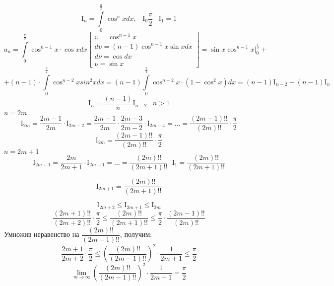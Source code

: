 \documentclass[../../main.tex]{subfiles}
\begin{document}
\[
\mathrm{I}_n = \int\limits_0^{\frac{\pi}{2}} \cos^n x dx, \;\;\;
\mathrm{I}_0 \dfrac{\pi}{2} \;\;\; \mathrm{I}_{1} = 1
\]
\[
a_n =  \int\limits_0^{\frac{\pi}{2}} \cos^{n - 1} x \cdot \cos x dx
\left[\begin{array}{l}
\upsilon = \cos^{n-1}x\\
d\upsilon = (n - 1) \cos^{n-1}x \sin x dx\\
d \nu = \cos dx\\
\nu = \sin x
\end{array}\right]
= \sin x \cos^{n-1} x \big|_0^{\frac{\pi}{2}} + 
\]
\[
+ (n - 1) \cdot \int\limits_{0}^{\frac{\pi}{2}} \cos^{n-2}x sin^2 x dx
= (n - 1) \int\limits_{0}^{\frac{\pi}{2}} \cos^{n-2}x \cdot (1 - \cos^{2}x)dx =
(n-1)\mathrm{I}_{n-2} - (n-1)\mathrm{I}_{n}
\]
\[\mathrm{I}_n = \dfrac{(n-1)}{n}\mathrm{I}_{n-2} \;\;\; n>1\]
$n = 2m$
\[
\mathrm{I}_{2m} = \dfrac{2m - 1}{2m} \cdot \mathrm{I}_{2m-2} = \dfrac{2m-1}{2m}
\cdot \dfrac{2m - 3}{2m-2} \cdot \mathrm{I}_{2m- 4} = \ldots =
\dfrac{(2m - 1)!!}{(2m)!!} \cdot \dfrac{\pi}{2}
\]
\[\mathrm{I}_{2m} = \dfrac{(2m - 1)!!}{(2m)!!} \cdot \dfrac{\pi}{2}\]
$n = 2m + 1$
\[
\mathrm{I}_{2m + 1} = \dfrac{2m}{2m + 1} \cdot \mathrm{I}_{2m-1} = \ldots =
\dfrac{(2m)!!}{(2m + 1)!!} \cdot \mathrm{I}_{1} = \dfrac{(2m)!!}{(2m + 1)!!} 
\]

\[\mathrm{I}_{2m + 1} = \dfrac{(2m)!!}{(2m + 1)!!}\]

\[
\mathrm{I}_{2m+2}\le \mathrm{I}_{2m+1}\le \mathrm{I}_{2m}
\]
\[
\dfrac{(2m+1)!!}{(2m+2)!!} \cdot \dfrac{\pi}{2} \le \dfrac{(2m)!!}{(2m+1)!!} 
\le \dfrac{\pi}{2} \cdot \dfrac{(2m-1)!!}{(2m)!!}
\]
Умножив неравенство на $\dfrac{(2m)!!}{(2m-1)!!}$, получим:
\[
\dfrac{2m+1}{2m+2} \cdot \dfrac{\pi}{2} \le \left( \dfrac{(2m)!!}
{(2m-1)!!}  \right)^2 \cdot \dfrac{1}{2m+1} \le \dfrac{\pi}{2}
\]
\[
\lim\limits_{m \to \infty} \left( \dfrac{(2m)!!} {(2m-1)!!}  \right)^2
\cdot \dfrac{1}{2m+1} = \dfrac{\pi}{2}
\]
\end{document}

